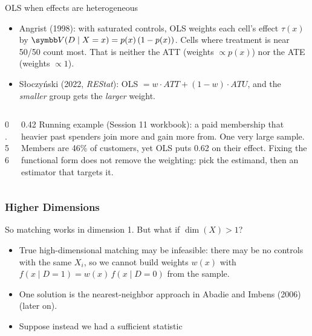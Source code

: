 \documentclass[aspectratio=169,11pt]{beamer}
\begin{document}
\begin{frame}{OLS when effects are heterogeneous}
\small
\begin{itemize}
\item Angrist (1998): with saturated controls, OLS weights each cell's effect $\tau(x)$ by
$\Var(D \mid X = x) = p(x)\,(1 - p(x))$. Cells where treatment is near 50/50 count most. That is neither the ATT
(weights $\propto p(x)$) nor the ATE (weights $\propto 1$).
\item Słoczyński (2022, \emph{REStat}): OLS $= w \cdot ATT + (1 - w) \cdot ATU$, and the \emph{smaller} group gets
the \emph{larger} weight.
\end{itemize}
\begin{columns}[T]
\begin{column}{0.56\textwidth}
\resizebox{\linewidth}{!}{}
\end{column}
\begin{column}{0.42\textwidth}
\footnotesize
Running example (Session 11 workbook): a paid membership that heavier past spenders join more and gain more from.
One very large sample. Members are 46\% of customers, yet OLS puts 0.62 on their effect. Fixing the functional form
does not remove the weighting: pick the estimand, then an estimator that targets it.
\end{column}
\end{columns}
\end{frame}



\begin{frame}
\frametitle{Higher Dimensions}
So matching works in dimension 1. But what if $\dim(X) > 1$?
\begin{itemize}
\item True high-dimensional matching may be infeasible: there may be no controls with the same $X_i$, so we cannot build weights $w(x)$ with $f(x \mid D=1) = w(x)\, f(x \mid D=0)$ from the sample.
\item One solution is the nearest-neighbor approach in Abadie and Imbens (2006) (later on).
\item Suppose instead we had a \alert{sufficient statistic}
\end{itemize}
\end{frame}
\end{document}

